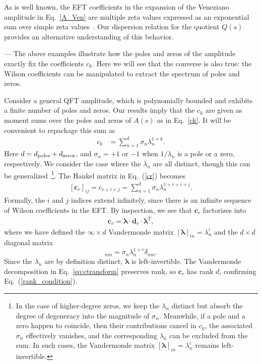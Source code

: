 \documentclass[twocolumn,english,aps,prd,reprint,floatfix,notitlepage,footinbib,preprintnumbers,superscriptaddress,longbibliography]{revtex4-1}
\newcommand{\be}{\begin{equation}}
\newcommand{\ee}{\end{equation}}
\newcommand{\Eq}[1]{Eq.~(\ref{#1})}
\newcommand{\eq}[2]{\be\begin{aligned}#1 \label{#2}\end{aligned}\ee}
\newcommand{\mysec}[1]{\noindent {\bf #1.}---}
\begin{document}
As is well known, the EFT coefficients in the expansion of the Veneziano amplitude in Eq.~\eqref{A_Ven} are multiple zeta values expressed as an exponential sum over simple zeta values~\cite{Schlotterer2012,green2019}. Our dispersion relation for the quotient $Q(s)$ provides an alternative understanding of this behavior.

\medskip
\mysec{Spectroscopy}
The above examples illustrate how the poles and zeros of the amplitude exactly fix the coefficients $c_k$.  Here we will see that the converse is also true: the Wilson coefficients can be manipulated to extract the spectrum of poles and zeros.


Consider a general QFT amplitude, which is polynomially bounded and exhibits a finite number of poles and zeros. Our results imply that the $c_k$ are given as moment sums over the poles and zeros of $A(s)$ as in Eq.~\eqref{ck}.
It will be convenient to repackage this sum as
\eq{
c_k &= \sum_{n=1}^d \sigma_n \lambda_n^{1+k}.
}{eq:ckd}
Here $d=d_{\rm poles}+d_{\rm zeros}$, and $\sigma_n= +1$ or $-1$ when $1/\lambda_n$ is a pole or a zero, respectively. We consider the case where the $\lambda_n$ are all distinct, though this can be generalized~\footnote{In the case of higher-degree zeros, we keep the $\lambda_n$ distinct but absorb the degree of degeneracy into the magnitude of $\sigma_n$.
Meanwhile, if a pole and a zero happen to coincide, then their contributions cancel in $c_k$, the associated $\sigma_n$ effectively vanishes, and the corresponding $\lambda_n$ can be excluded from the sum.
In such cases, the Vandermonde matrix $[\boldsymbol{\lambda}]_{in} = \lambda_n^i$ remains left-invertible.}. The Hankel matrix in \Eq{cr} becomes
\eq{
[\mathbf{c}_{r}]_{ij} = c_{r+i+j} = \sum_{n=1}^d \sigma_n \lambda_n^{1+r+i+j}.
}{}
Formally, the $i$ and $j$ indices extend infinitely, since there is an infinite sequence of Wilson coefficients in the EFT.
By inspection, we see that $\mathbf{c}_{r}$ factorizes into
\eq{
\mathbf{c}_{r} = \boldsymbol{\lambda}\cdot \mathbf{d}_{r}\cdot \boldsymbol{\lambda}^T,
}{eq:ctransform}
where we have defined the $\infty \times d$ Vandermonde matrix $[\boldsymbol{\lambda}]_{in} = \lambda_n^i$ and the $d\times d$ diagonal matrix
\be
[\mathbf{d}_{r}]_{nm} = \sigma_n \lambda_n^{1+r}  \delta_{nm}.\label{eq:dmat}
\ee
Since the $\lambda_n$ are by definition distinct, $\boldsymbol{\lambda}$ is left-invertible. The Vandermonde decomposition in Eq.~\eqref{eq:ctransform} preserves rank, so $\mathbf{c}_{r}$ has rank $d$, confirming \Eq{rank_condition}.
\end{document}
